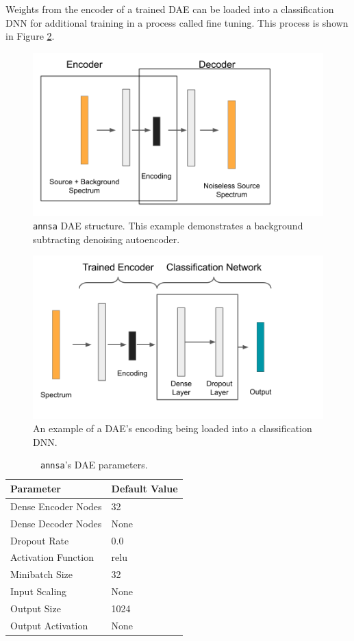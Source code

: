 Weights from the encoder of a trained DAE can be loaded into a classification DNN for additional training in a process called fine tuning. This process is shown in Figure \ref{fig:annsa_daednn}.

\begin{figure}[H]
\centering
\includegraphics[trim=0 0 125 0,clip,width=0.8\linewidth]{images/annsa_dae.png}
\caption{\texttt{annsa} DAE structure. This example demonstrates a background subtracting denoising autoencoder.}
\label{fig:annsa_dae}
\end{figure}

\begin{figure}[H]
\centering
\includegraphics[trim=0 40 85 0,clip,width=0.8\linewidth]{images/annsa_daednn.png}
\caption{An example of a DAE's encoding being loaded into a classification DNN.}
\label{fig:annsa_daednn}
\end{figure}


\begin{table}[H]
\centering
\caption{\texttt{annsa}'s DAE parameters.}
\begin{tabular}{ll}
\hline
\textbf{Parameter} & \textbf{Default Value}\\ \hline
Dense Encoder Nodes & 32\\
Dense Decoder Nodes & None \\
Dropout Rate & 0.0 \\
Activation Function & relu \\
Minibatch Size & 32 \\ 
Input Scaling & None \\
Output Size & 1024 \\
Output Activation & None \\ \hline
\end{tabular}
\label{table:annsa_dae_params}
\end{table}



